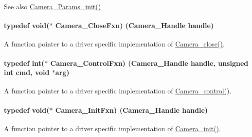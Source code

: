 \begin{DoxySeeAlso}{See also}
\hyperlink{_camera_8h_a522620ae3e5fb202b1f46f5535619564}{Camera\+\_\+\+Params\+\_\+init()} 
\end{DoxySeeAlso}
\paragraph[{Camera\+\_\+\+Close\+Fxn}]{\setlength{\rightskip}{0pt plus 5cm}typedef void($\ast$ Camera\+\_\+\+Close\+Fxn) ({\bf Camera\+\_\+\+Handle} handle)}\label{_camera_8h_ae6f2789af3ea253197fd2ce98db352f4}


A function pointer to a driver specific implementation of \hyperlink{_camera_8h_a132c638e5ea994c1f06124f5762470b4}{Camera\+\_\+close()}. 

\paragraph[{Camera\+\_\+\+Control\+Fxn}]{\setlength{\rightskip}{0pt plus 5cm}typedef int($\ast$ Camera\+\_\+\+Control\+Fxn) ({\bf Camera\+\_\+\+Handle} handle, unsigned int cmd, void $\ast$arg)}\label{_camera_8h_ae81dd59b680fa8d7a3a9f8fc226f593f}


A function pointer to a driver specific implementation of \hyperlink{_camera_8h_adfc7e9a60daa499220296a238a09b393}{Camera\+\_\+control()}. 

\paragraph[{Camera\+\_\+\+Init\+Fxn}]{\setlength{\rightskip}{0pt plus 5cm}typedef void($\ast$ Camera\+\_\+\+Init\+Fxn) ({\bf Camera\+\_\+\+Handle} handle)}\label{_camera_8h_a3b6d043e96bfc1f1443521ef10ea01f3}


A function pointer to a driver specific implementation of \hyperlink{_camera_8h_ab0208c74b70ac5b50cb26c36f1f3ebad}{Camera\+\_\+init()}. 

